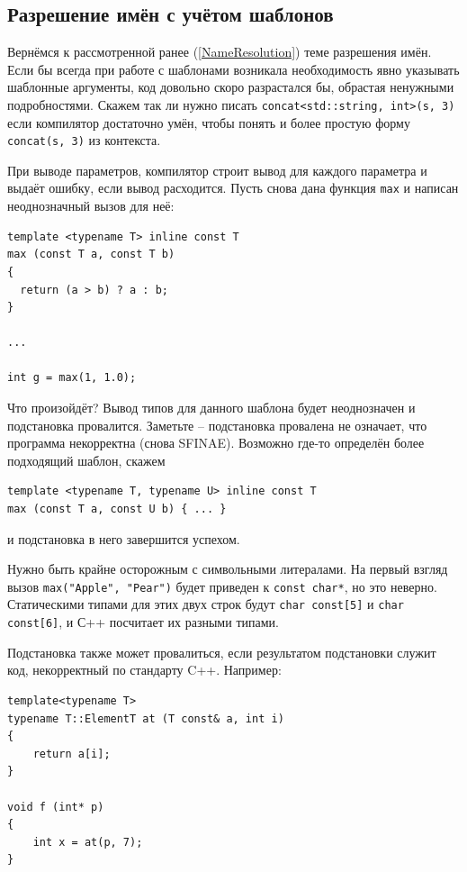 \documentclass[a4paper,12pt,oneside]{article}
\begin{document}
\subsection{Разрешение имён с учётом шаблонов}

Вернёмся к рассмотренной ранее (\ref{NameResolution}) теме разрешения имён. Если бы всегда при работе с шаблонами возникала необходимость явно указывать шаблонные аргументы, код довольно скоро разрастался бы, обрастая ненужными подробностями. Скажем так ли нужно писать \lstinline!concat<std::string, int>(s, 3)! если компилятор достаточно умён, чтобы понять и более простую форму \lstinline!concat(s, 3)! из контекста.

При выводе параметров, компилятор строит вывод для каждого параметра и выдаёт ошибку, если вывод расходится. Пусть снова дана функция \lstinline!max! и написан неоднозначный вызов для неё:

\begin{lstlisting}
template <typename T> inline const T 
max (const T a, const T b)
{
  return (a > b) ? a : b;
} 

...

int g = max(1, 1.0);

\end{lstlisting}

Что произойдёт? Вывод типов для данного шаблона будет неоднозначен и подстановка провалится. Заметьте -- подстановка провалена не означает, что программа некорректна (снова SFINAE). Возможно где-то определён более подходящий шаблон, скажем 

\begin{lstlisting}
template <typename T, typename U> inline const T 
max (const T a, const U b) { ... }
\end{lstlisting}

и подстановка в него завершится успехом. 

Нужно быть крайне осторожным с символьными литералами. На первый взгляд вызов \lstinline!max("Apple", "Pear")! будет приведен к \lstinline!const char*!, но это неверно. Статическими типами для этих двух строк будут \lstinline!char const[5]! и \lstinline!char const[6]!, и С++ посчитает их разными типами.

Подстановка также может провалиться, если результатом подстановки служит код, некорректный по стандарту C++. Например:

\begin{lstlisting}
template<typename T> 
typename T::ElementT at (T const& a, int i) 
{ 
    return a[i]; 
} 

void f (int* p) 
{ 
    int x = at(p, 7); 
} 
\end{lstlisting}
\end{document}

